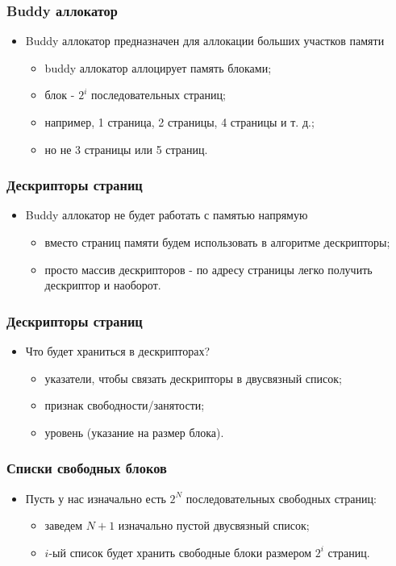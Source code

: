 \begin{frame}
\frametitle{Buddy аллокатор}
\begin{itemize}
    \item<1->Buddy аллокатор предназначен для аллокации больших участков памяти
    \begin{itemize}
        \item<2->buddy аллокатор аллоцирует память блоками;
        \item<3->блок - $2^i$ последовательных страниц;
        \item<4->например, 1 страница, 2 страницы, 4 страницы и т. д.;
	\item<4->но не 3 страницы или 5 страниц.
    \end{itemize}
\end{itemize}
\end{frame}

\begin{frame}
\frametitle{Дескрипторы страниц}
\begin{itemize}
    \item<1->Buddy аллокатор не будет работать с памятью напрямую
    \begin{itemize}
        \item<2->вместо страниц памяти будем использовать в алгоритме
        дескрипторы;
        \item<3->просто массив дескрипторов - по адресу страницы легко получить
        дескриптор и наоборот.
    \end{itemize}
\end{itemize}
\end{frame}

\begin{frame}
\frametitle{Дескрипторы страниц}
\begin{itemize}
    \item<1->Что будет храниться в дескрипторах?
    \begin{itemize}
        \item<2->указатели, чтобы связать дескрипторы в двусвязный список;
        \item<3->признак свободности/занятости;
        \item<4->уровень (указание на размер блока).
    \end{itemize}
\end{itemize}
\end{frame}

\begin{frame}
\frametitle{Списки свободных блоков}
\begin{itemize}
    \item<1->Пусть у нас изначально есть $2^N$ последовательных свободных
    страниц:
    \begin{itemize}
        \item<1->заведем $N + 1$ изначально пустой двусвязный список;
        \item<1->$i$-ый список будет хранить свободные блоки размером $2^i$
        страниц.
    \end{itemize}
\end{itemize}
\end{frame}

